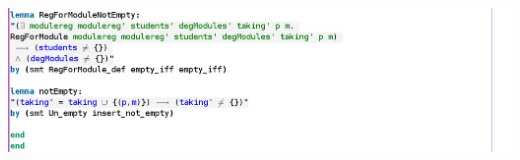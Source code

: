 \noindent \includegraphics[scale=0.5]{examples/modulereg/6imagef.png}

%



%
%
%
%
%
%
%
%
%
%
%
%
%
%
%
%
%
%
%
